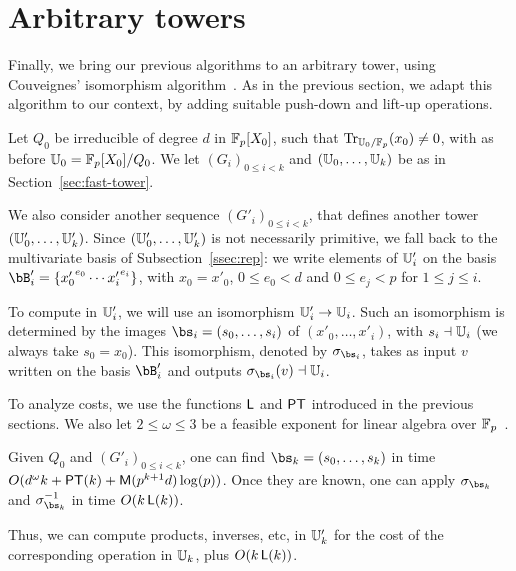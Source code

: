 \section{Arbitrary towers}
\label{sec:couveignes-algorithm}

Finally, we bring our previous algorithms to an arbitrary tower, using
Couveignes' isomorphism algorithm~\cite{Couveignes00}. As in the
previous section, we adapt this algorithm to our context, by adding
suitable push-down and lift-up operations.

Let $Q_0$ be irreducible of degree $d$ in $\mathbb{F}_p[X_0]$, such that
$\operatorname{Tr}_{\mathbb{U}_0/\mathbb{F}_p}(x_0)\ne0$, with as before
$\mathbb{U}_0=\mathbb{F}_p[X_0]/Q_0$. We let $(G_i)_{0 \le i < k}$ and
$(\mathbb{U}_0,\ldots,\mathbb{U}_k)$ be as in Section~\ref{sec:fast-tower}.

We also consider another sequence $(G'_i)_{0 \le i < k}$, that defines
another tower $(\mathbb{U}'_0,\ldots,\mathbb{U}'_k)$.  Since $(\mathbb{U}'_0,\ldots,\mathbb{U}'_k)$ is
not necessarily primitive, we fall back to the multivariate basis of
Subsection~\ref{ssec:rep}: we write elements of $\mathbb{U}'_i$ on the basis
$\bB'_i=\{{x'_0}^{e_0} \cdots {x'_i}^{e_i}\}$, with $x_0=x'_0$, $0 \le
e_0 < d$ and $0\le e_j < p$ for $1 \le j \le i$.

To compute in $\mathbb{U}'_i$, we will use an isomorphism $\mathbb{U}'_i \to \mathbb{U}_i$.
Such an isomorphism is determined by the images
$\bs_i=(s_0,\dots,s_i)$ of $(x'_0,\dots,x'_i)$, with $s_i \dashv \mathbb{U}_i$
(we always take $s_0=x_0$). This isomorphism, denoted by
$\sigma_{\bs_i}$, takes as input $v$ written on the basis $\bB'_i$ and
outputs $\sigma_{\bs_i}(v)\wrt \U_i$.

To analyze costs, we use the functions $\mathsf{L}$ and $\mathrm{\sf PT}$ introduced in
the previous sections. We also let $2 \le \omega \le 3$ be a feasible
exponent for linear algebra over $\mathbb{F}_p$~\cite[Ch.~12]{vzGG}.
\begin{theorem}\label{theo:main}
  Given $Q_0$ and $(G'_i)_{0 \le i < k}$, one can find
  $\bs_k=(s_0,\dots,s_k)$ in time $O(d^\omega k + \mathrm{\sf PT}(k) +
  \mathrm{\sf M}(p^{k+1} d) \log(p))$. Once they are known, one can apply
  $\sigma_{\bs_k}$ and $\sigma_{\bs_k}^{-1}$ in time $O(k\, \mathsf{L}(k))$.
\end{theorem}
Thus, we can compute products, inverses, etc, in $\mathbb{U}'_k$ for
the cost of the corresponding operation in $\mathbb{U}_k$, plus $O(k\,
\mathsf{L}(k))$.


